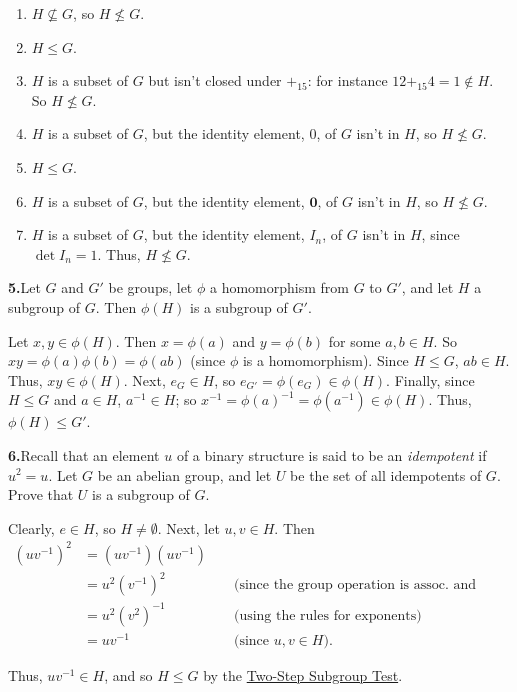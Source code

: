 \documentclass[10pt,]{book}
\theoremstyle{plain}
\theoremstyle{definition}
\theoremstyle{definition}
\theoremstyle{definition}
\theoremstyle{definition}
\numberwithin{equation}{section}
\def\0{\mathbf 0}
\newcommand{\amp}{&}
\begin{document}
%
\par\smallskip
\leavevmode%
\begin{enumerate}[label=(\alph*)]
\item\hypertarget{li-239}{}\(H\not\subseteq G\), so \(H\not\leq G\).%
\item\hypertarget{li-240}{}\(H\leq G\).%
\item\hypertarget{li-241}{}\(H\) is a subset of \(G\) but isn't closed under \(+_{15}\): for instance \(12+_{15}4=1\not\in H\).  So \(H\not\leq G\).%
\item\hypertarget{li-242}{}\(H\) is a subset of \(G\), but the identity element, 0, of \(G\) isn't in \(H\), so \(H\not\leq G\).%
\item\hypertarget{li-243}{}\(H\leq G\).%
\item\hypertarget{li-244}{}\(H\) is a subset of \(G\), but the identity element, \(\0\), of \(G\) isn't in \(H\), so \(H\not\leq G\).%
\item\hypertarget{li-245}{}\(H\) is a subset of \(G\), but the identity element, \(I_n\), of \(G\) isn't in \(H\), since \(\det I_n=1\).  Thus, \(H\not\leq G\).%
\end{enumerate}
\par\smallskip
\noindent\textbf{5.}\quad{}Let \(G\) and \(G'\) be groups, let \(\phi\) a homomorphism from \(G\) to \(G'\), and let \(H\) a subgroup of \(G\). Then \(\phi(H)\) is a subgroup of \(G'\).%
\par\smallskip
Let \(x,y\in \phi(H)\). Then \(x=\phi(a)\) and \(y=\phi(b)\) for some \(a,b\in H\). So \(xy=\phi(a)\phi(b)=\phi(ab)\) (since \(\phi\) is a homomorphism). Since \(H\leq G\), \(ab\in H\). Thus, \(xy\in \phi(H)\). Next, \(e_G\in H\), so \(e_{G'}=\phi(e_G)\in \phi(H)\). Finally, since \(H\leq G\) and \(a\in H\), \(a^{-1}\in H\); so \(x^{-1}=\phi(a)^{-1}=\phi(a^{-1}) \in \phi(H)\). Thus, \(\phi(H)\leq G'\).%
\par\smallskip
\noindent\textbf{6.}\quad{}Recall that an element \(u\) of a binary structure is said to be an \emph{idempotent} if \(u^2=u\). Let \(G\) be an abelian group, and let \(U\) be the set of all idempotents of \(G\). Prove that \(U\) is a subgroup of \(G\).%
\par\smallskip
Clearly, \(e\in H\), so \(H\neq \emptyset\). Next, let \(u,v\in H\). Then%
\begin{align*}
(uv^{-1})^2\amp =(uv^{-1})(uv^{-1})\amp \amp\\
\amp =u^2(v^{-1})^2 \amp \amp \text{ (since the group operation is assoc. and comm.) }\\
\amp =u^2(v^2)^{-1} \amp \amp \text{ (using the rules for exponents) }\\
\amp =uv^{-1}\amp \amp \text{ (since \(u,v\in H\)). }
\end{align*}
%
\par
Thus, \(uv^{-1}\in H\), and so \(H \leq G\) by the \hyperref[twostep]{Two-Step Subgroup Test}.%
\par\smallskip
\end{document}
